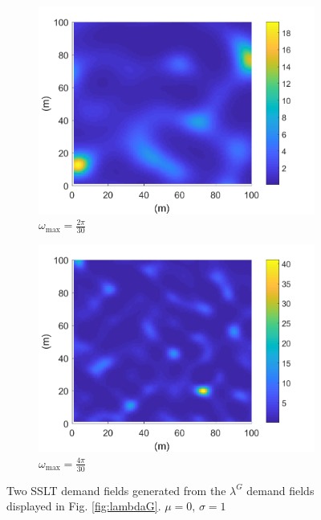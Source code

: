 \documentclass[12pt,dvipsnames]{report}
\begin{document}
\begin{figure}[!ht]
\centering
\begin{subfigure}{.45\textwidth}
	\centering
	\includegraphics[width=1\linewidth]{lambda_O2pi-300_L100000_X100_Y100}
	\caption{\small $\omega_{\max}=\frac{2 \pi}{30}$}
	\label{fig:lambda_2pi-300}
\end{subfigure}
\hspace{0.5cm}
\begin{subfigure}{.45\textwidth}
	\centering
	\includegraphics[width=1\linewidth]{lambda_O4pi-300_L100000_X100_Y100}
	\caption{\small $\omega_{\max}=\frac{4 \pi}{30}$}
	\label{fig:lambda_4pi-300}
\end{subfigure}
\caption[Generated example SSLT demand fields]{\small Two SSLT demand fields generated from the $\lambda^G$ demand fields displayed in Fig. \ref{fig:lambdaG}. $\mu = 0,\, \sigma = 1$}
\label{fig:lambda}
\end{figure}
\end{document}
